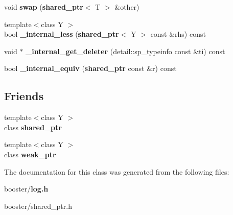 \begin{DoxyCompactItemize}
\item 
void {\bfseries swap} ({\bf shared\+\_\+ptr}$<$ T $>$ \&other)\label{classbooster_1_1shared__ptr_af3cbdb878ddb9e4691bea4dfffb6ffd5}

\item 
{\footnotesize template$<$class Y $>$ }\\bool {\bfseries \+\_\+internal\+\_\+less} ({\bf shared\+\_\+ptr}$<$ Y $>$ const \&rhs) const \label{classbooster_1_1shared__ptr_a3b4f56f5e1c30ed8c2c7ff206b1ce3d2}

\item 
void $\ast$ {\bfseries \+\_\+internal\+\_\+get\+\_\+deleter} (detail\+::sp\+\_\+typeinfo const \&ti) const \label{classbooster_1_1shared__ptr_ae1f59324d5aae7890617e51ebdeee365}

\item 
bool {\bfseries \+\_\+internal\+\_\+equiv} ({\bf shared\+\_\+ptr} const \&r) const \label{classbooster_1_1shared__ptr_a7da6eb1a5ea8e47fcc091785c28cf3dc}

\end{DoxyCompactItemize}
\subsection*{Friends}
\begin{DoxyCompactItemize}
\item 
{\footnotesize template$<$class Y $>$ }\\class {\bfseries shared\+\_\+ptr}\label{classbooster_1_1shared__ptr_ab2104fa6e839672da3c30400e8325e52}

\item 
{\footnotesize template$<$class Y $>$ }\\class {\bfseries weak\+\_\+ptr}\label{classbooster_1_1shared__ptr_a27df6e2a1650d985bdeda33f0303c83f}

\end{DoxyCompactItemize}


The documentation for this class was generated from the following files\+:\begin{DoxyCompactItemize}
\item 
booster/{\bf log.\+h}\item 
booster/shared\+\_\+ptr.\+h\end{DoxyCompactItemize}
